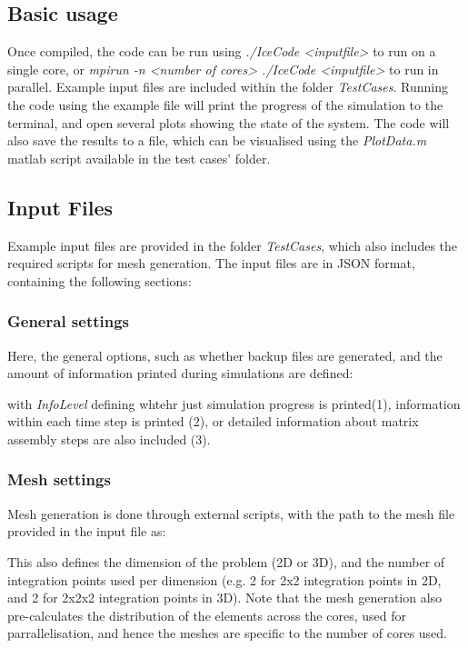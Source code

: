 \documentclass[3p]{elsarticle} %
\newcommand{\CodeSnipU}[4]{}
\begin{document}
\subsection{Basic usage}
\label{sec:usage}
Once compiled, the code can be run using \textit{./IceCode <inputfile>} to run on a single core, or \textit{mpirun -n <number of cores> ./IceCode <inputfile>} to run in parallel. Example input files are included within the folder \textit{TestCases}. Running the code using the example file will print the progress of the simulation to the terminal, and open several plots showing the state of the system. The code will also save the results to a file, which can be visualised using the \textit{PlotData.m} matlab script available in the test cases' folder. 

\subsection{Input Files}
Example input files are provided in the folder \textit{TestCases}, which also includes the required scripts for mesh generation. The input files are in JSON format, containing the following sections:

\subsubsection{General settings}
Here, the general options, such as whether backup files are generated, and the amount of information printed during simulations are defined:
\CodeSnipU{TestCases/TriAxialCompression/TriAxial.json}{2}{10}{TestCases/TriAxialCompression/TriAxial.json} 
with \textit{InfoLevel} defining whtehr just simulation progress is printed(1), information within each time step is printed (2), or detailed information about matrix assembly steps are also included (3).

\subsubsection{Mesh settings}
Mesh generation is done through external scripts, with the path to the mesh file provided in the input file as:
\CodeSnipU{TestCases/TriAxialCompression/TriAxial.json}{11}{15}{TestCases/TriAxialCompression/TriAxial.json} 
This also defines the dimension of the problem (2D or 3D), and the number of integration points used per dimension (e.g. 2 for 2x2 integration points in 2D, and 2 for 2x2x2 integration points in 3D). Note that the mesh generation also pre-calculates the distribution of the elements across the cores, used for parrallelisation, and hence the meshes are specific to the number of cores used.
\end{document}
